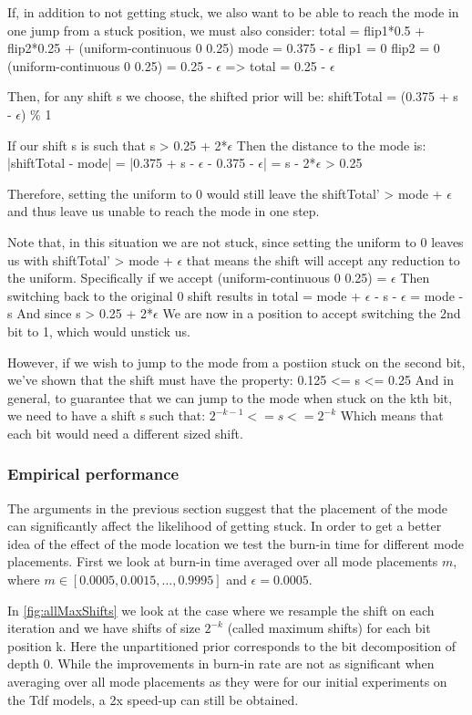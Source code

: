 If, in addition to not getting stuck, we also want to be able to reach the mode in one jump from a stuck position, we must also consider:
total = flip1*0.5 + flip2*0.25 + (uniform-continuous 0 0.25)
mode = 0.375 - $\epsilon$
flip1 = 0
flip2 = 0
(uniform-continuous 0 0.25) = 0.25 - $\epsilon$ 
=> total = 0.25 - $\epsilon$

Then, for any shift s we choose, the shifted prior will be:
shiftTotal = (0.375 + s - $\epsilon$) \% 1 

If our shift s is such that
s > 0.25 + 2*$\epsilon$
Then the distance to the mode is:
|shiftTotal - mode| = |0.375 + s - $\epsilon$ - 0.375 - $\epsilon$| = s - 2*$\epsilon$ > 0.25

Therefore, setting the uniform to 0 would still leave the shiftTotal' > mode + $\epsilon$  and thus leave us unable to reach the mode in one step.

Note that, in this situation we are not stuck, since setting the uniform to 0 leaves us with shiftTotal' > mode + $\epsilon$ that means the shift will accept any reduction to the uniform. Specifically if we accept (uniform-continuous 0 0.25) = $\epsilon$ Then switching back to the original 0 shift results in total = mode + $\epsilon$ - s - $\epsilon$ = mode - s And since s > 0.25 + 2*$\epsilon$ We are now in a position to accept switching the 2nd bit to 1, which would unstick us.

However, if we wish to jump to the mode from a postiion stuck on the second bit, we've shown that the shift must have the property:
0.125 <= s <= 0.25
And in general, to guarantee that we can jump to the mode when stuck on the kth bit, we need to have a shift s such that:
$2^{-k-1} <= s <= 2^{-k}$ Which means that each bit would need a different sized shift.

\subsubsection{Empirical performance}

The arguments in the previous section suggest that the placement of the mode can significantly affect the likelihood of getting stuck. In order to get a better idea of the effect of the mode location we test the burn-in time for different mode placements. First we look at burn-in time averaged over all mode placements $m$, where $m \in [0.0005, 0.0015,…, 0.9995]$ and $\epsilon = 0.0005$.

In \ref{fig:allMaxShifts} we look at the case where we resample the shift on each iteration and we have shifts of size $2^{-k}$ (called maximum shifts) for each bit position k. Here the unpartitioned prior corresponds to the bit decomposition of depth 0. While the improvements in burn-in rate are not as significant when averaging over all mode placements as they were for our initial experiments on the Tdf models, a 2x speed-up can still be obtained.

